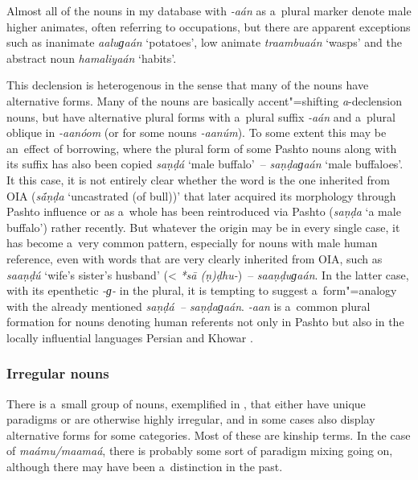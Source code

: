 Almost all of the nouns in my database with \textit{-aán} as a~plural marker denote male higher animates, often referring to occupations, but there are apparent exceptions such as inanimate \textit{aaluɡaán} `potatoes', low animate \textit{traambuaán} `wasps' and the abstract noun \textit{hamaliyaán} `habits'.


This declension is heterogenous in the sense that many of the nouns have alternative forms. Many of
the nouns are basically accent"=shifting \textit{a}-declension nouns, but have alternative plural
forms with a~plural suffix \textit{-aán} and a~plural oblique in
\textit{-aanóom} (or for some nouns \textit{-aanúm}). To some extent
this may be an~effect of borrowing, where the plural form of some Pashto nouns along with its suffix
has also been copied \textit{saṇḍá} `male buffalo'~-- \textit{saṇḍaɡaán} `male
buffaloes'. It this case, it is not entirely clear whether the word is the one inherited from OIA
(\textit{s\'{\={a}}ṇḍa} `uncastrated (of bull))' that later acquired its morphology through Pashto
influence or as a~whole has been reintroduced via Pashto (\textit{saṇḍa} `a male buffalo') rather
recently. But whatever the origin may be in every single case, it has become a~very common pattern,
especially for nouns with male human reference, even with words that are very clearly inherited from
OIA, such as \textit{saaṇḍú} `wife's sister's husband' ({\textless} \textit{*s\={a}\'{
  }(ṇ)ḍhu-})~-- \textit{saaṇḍuɡaán}. In the latter case, with its epenthetic
\textit{-ɡ-} in the plural, it is tempting to suggest a~form"=analogy with the already
mentioned \textit{saṇḍá~-- saṇḍaɡaán}. \textit{-aan} is a~common plural
formation for nouns denoting human referents not only in Pashto but also in the locally influential
languages Persian \citep[431]{windfuhrperry2009} and Khowar \citep[221--225]{endresenkristiansen1981}.

\subsubsection*{Irregular nouns}

There is a~small group of nouns, exemplified in , that either have unique paradigms or are otherwise highly irregular, and in some cases also display alternative forms for some categories. Most of these are kinship terms. In the case of \textit{maámu/maamaá}, there is probably some sort of paradigm mixing going on, although there may have been a~distinction in the past.


